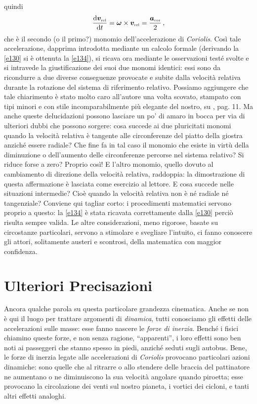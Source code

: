 \noindent quindi 
\begin{equation}
{{\rm d}{\bm v}_{\scriptscriptstyle{{\rm rel}}}\over{\rm d}t}=
{\bm \omega}\times 
{\bm v}_{\scriptscriptstyle{{\rm rel}}}=
{{\bm a}_{\scriptscriptstyle{{\rm cor}}}\over{2}}\,,
\label{e143}
\end{equation}
\noindent che \`e il secondo (o il primo?) monomio dell'accelerazione di {\em Coriolis}.
Cos\`i tale accelerazione, dapprima introdotta
mediante un calcolo formale (derivando la \ref{e130} si \`e ottenuta
la \ref{e134}), si ricava ora mediante le osservazioni test\'e svolte e si
intravede la giustificazione dei suoi due monomi identici: essi sono
da ricondurre a due diverse conseguenze provocate e subite dalla velocit\`a
relativa durante la rotazione del sistema di riferimento relativo.
Possiamo aggiungere che tale chiarimento \`e stato molto
caro all'autore una volta scovato, stampato con tipi minori e con stile
incomparabilmente pi\`u elegante del nostro, su \cite{sesini1}, pag. 11.
Ma anche queste delucidazioni possono lasciare un po' di amaro in bocca per via di ulteriori dubbi che possono sorgere:
cosa succede ai due pluricitati monomi quando la velocit\`a relativa \`e tangente alle circonferenze
del piatto della giostra anzich\'e essere radiale? Che fine fa in tal caso il monomio che
esiste in virt\`u della diminuzione o dell'aumento delle circonferenze percorse nel sistema
relativo? Si riduce forse a zero? Proprio cos\`i! E l'altro monomio, quello dovuto al
cambiamento di direzione della velocit\`a relativa, raddoppia: la dimostrazione di
questa affermazione \`e lasciata come esercizio al lettore.
E cosa succede nelle situazioni intermedie? Cio\`e quando
la velocit\`a relativa non \`e n\'e radiale n\'e tangenziale? Conviene qui
tagliar corto: i procedimenti
matematici servono proprio a questo: la \ref{e134} \`e stata ricavata correttamente
dalla \ref{e130} perci\`o risulta sempre valida. Le altre considerazioni, meno rigorose,
basate su circostanze particolari, servono a stimolare e svegliare l'intuito, ci
fanno conoscere gli attori, solitamente austeri e scontrosi, della matematica con
maggior confidenza.

\section{Ulteriori Precisazioni}

\noindent Ancora qualche parola su questa particolare grandezza cinematica. Anche se
non \`e qui il luogo per trattare argomenti di {\em dinamica}, tutti conosciamo
gli effetti delle accelerazioni sulle masse: esse fanno nascere le {\em forze di inerzia}.
Bench\'e i fisici chiamino queste forze, e non senza ragione,
 ``apparenti'', i loro effetti sono ben noti
ai passeggeri che stanno spesso
in piedi, anzich\'e seduti sugli autobus. Bene, le forze di inerzia legate alle accelerazioni di {\em Coriolis}
provocano particolari azioni dinamiche: sono quelle che al ritrarre o allo stendere
delle braccia del pattinatore ne aumentano o ne diminuiscono
la sua velocit\`a angolare quando piroetta;
esse provocano la circolazione dei venti sul nostro pianeta,
i vortici dei cicloni, e tanti altri effetti analoghi.

